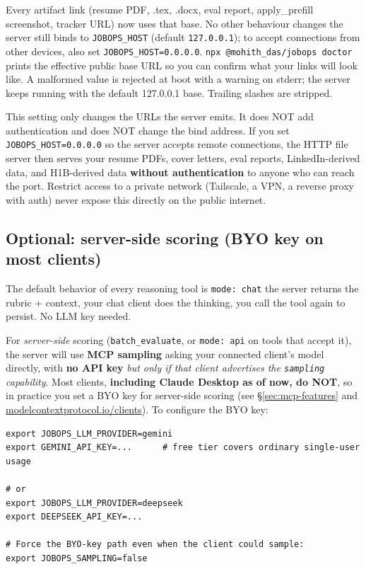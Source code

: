 \documentclass[11pt,letterpaper]{article}
\newcommand{\tool}[1]{\texttt{#1}}
\newcommand{\env}[1]{\texttt{#1}}
\newcommand{\cmd}[1]{\texttt{#1}}
\begin{document}
Every artifact link (resume PDF, .tex, .docx, eval report, apply\_prefill screenshot,
tracker URL) now uses that base. No other behaviour changes \textemdash{} the server still
binds to \env{JOBOPS\_HOST} (default \texttt{127.0.0.1}); to accept connections from other
devices, also set \env{JOBOPS\_HOST=0.0.0.0}. \cmd{npx @mohith\_das/jobops doctor} prints the
effective public base URL so you can confirm what your links will look like. A malformed
value is rejected at boot with a warning on stderr; the server keeps running with the
default 127.0.0.1 base. Trailing slashes are stripped.

\begin{warnbox}
This setting only changes the URLs the server emits. It does NOT add authentication and
does NOT change the bind address. If you set \env{JOBOPS\_HOST=0.0.0.0} so the server
accepts remote connections, the HTTP file server then serves your resume PDFs, cover
letters, eval reports, LinkedIn-derived data, and H1B-derived data \textbf{without
authentication} to anyone who can reach the port. Restrict access to a private network
(Tailscale, a VPN, a reverse proxy with auth) \textemdash{} never expose this directly on the
public internet.
\end{warnbox}

\subsection*{Optional: server-side scoring (BYO key on most clients)}

The default behavior of every reasoning tool is \texttt{mode: chat} \textemdash{} the server returns the rubric + context, your chat client does the thinking, you call the tool again to persist. No LLM key needed.

For \emph{server-side} scoring (\tool{batch\_evaluate}, or \texttt{mode: api} on tools that accept it), the server will use \textbf{MCP sampling} \textemdash{} asking your connected client's model directly, with \textbf{no API key} \textemdash{} \emph{but only if that client advertises the \texttt{sampling} capability}. Most clients, \textbf{including Claude Desktop as of now, do NOT}, so in practice you set a BYO key for server-side scoring (see \S\ref{sec:mcp-features} and \href{https://modelcontextprotocol.io/clients}{modelcontextprotocol.io/clients}). To configure the BYO key:

\begin{lstlisting}[language=bashplus]
export JOBOPS_LLM_PROVIDER=gemini
export GEMINI_API_KEY=...      # free tier covers ordinary single-user usage

# or
export JOBOPS_LLM_PROVIDER=deepseek
export DEEPSEEK_API_KEY=...

# Force the BYO-key path even when the client could sample:
export JOBOPS_SAMPLING=false
\end{lstlisting}
\end{document}
